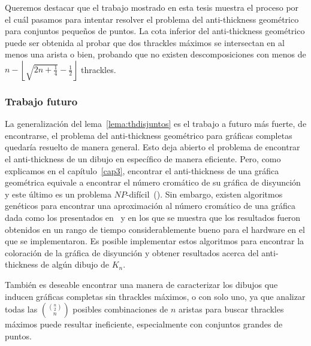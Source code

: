 Queremos destacar que el trabajo mostrado en esta tesis muestra el proceso por el cuál pasamos para
intentar resolver el problema del anti-thickness geométrico para conjuntos pequeños de puntos. La cota
inferior del anti-thickness geométrico puede ser obtenida al probar que dos thrackles máximos se
intersectan en al menos una arista o bien, probando que no existen descomposiciones con menos de $n -
\left\lfloor \sqrt{2n + \frac{1}{4}} - \frac{1}{2}\right\rfloor$ thrackles.


\subsubsection{Trabajo futuro}

La generalización del lema~\ref{lema:thdisjuntos} es el trabajo a futuro más fuerte, de encontrarse, el
problema del anti-thickness geométrico para gráficas completas quedaría resuelto de manera general. Esto
deja abierto el problema de encontrar el anti-thickness de un dibujo en específico de manera eficiente.
Pero, como explicamos en el capítulo~\ref{cap3}, encontrar el anti-thickness de una gráfica geométrica equivale a encontrar el número cromático de su gráfica de disyunción y este último es un problema $NP$-difícil~(\cite{Skiena2003}). Sin embargo, existen algoritmos genéticos para encontrar una aproximación al número cromático de una gráfica dada como los presentados en~\cite{Fleurent1996} y \cite{Galinier1999} en los que se muestra que los resultados fueron obtenidos en un rango de tiempo considerablemente bueno para el hardware en el que se implementaron. Es posible implementar estos algoritmos para encontrar la coloración de la gráfica de disyunción y obtener resultados acerca del anti-thickness de algún dibujo de $K_n$.

También es deseable encontrar una manera de caracterizar los dibujos que inducen gráficas completas sin
thrackles máximos, o con solo uno, ya que analizar todas las $\displaystyle \binom{\binom{n}{2}}{n}$
posibles combinaciones de $n$ aristas para buscar thrackles máximos puede resultar ineficiente,
especialmente con conjuntos grandes de puntos.
